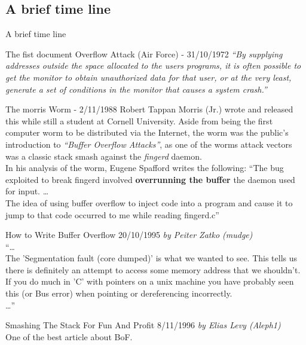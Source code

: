 \subsection{A brief time line}
\begin{frame}{A brief time line}
\begin{block}{The fist document Overflow Attack (Air Force) - 31/10/1972}
\emph{``By supplying addresses outside the space allocated to the users
programs, it is often possible to get the monitor to obtain unauthorized
data for that user, or at the very least, generate a set of conditions in
the monitor that causes a system crash.''}
\end{block}

\framebreak

\begin{block}{The morris Worm - 2/11/1988}
Robert Tappan Morris (Jr.) wrote and released this while still a student at Cornell University. Aside from being the first computer worm to be distributed via the Internet, the worm was the public’s introduction to \emph{``Buffer Overflow Attacks''}, as one of the worms attack vectors was a classic stack smash against the \emph{fingerd} daemon.\\
In his analysis of the worm, Eugene Spafford writes the following: ``The bug exploited to break fingerd involved {\bf overrunning the buffer} the daemon used for input. \ldots \\
The idea of using buffer overflow to inject code into a program and cause it to jump to that code occurred to me while reading fingerd.c''
\end{block}

\framebreak

\begin{block}{How to Write Buffer Overflow 20/10/1995}
\emph{by Peiter Zatko (mudge)}\\
``\ldots \\
    The 'Segmentation fault (core dumped)' is what we wanted to see. This
    tells us there is definitely an attempt to access some memory address
    that we shouldn't. If you do much in 'C' with pointers on a unix
    machine you have probably seen this (or Bus error) when pointing or
    dereferencing incorrectly.\\
\ldots ''
\end{block}

\begin{block}{Smashing The Stack For Fun And Profit 8/11/1996}
\emph{by Elias Levy (Aleph1)}\\
One of the best article about BoF.
\end{block}

\end{frame}
